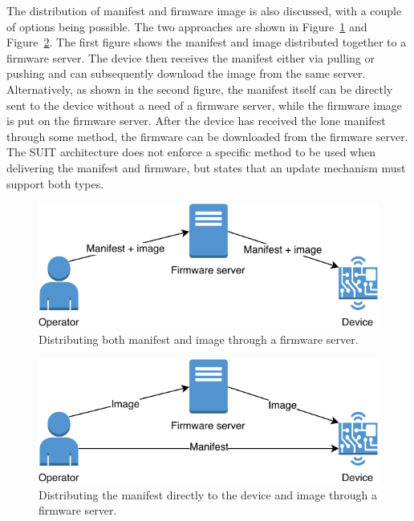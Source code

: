 \documentclass[0-thesis.tex]{subfiles}
\begin{document}
The distribution of manifest and firmware image is also discussed, with a couple of
options being possible. The two approaches are shown in
Figure~\ref{fig:manifest-image-combined-distribution} and
Figure~\ref{fig:manifest-image-separate-distribution}. The first figure shows the manifest
and image distributed together to a firmware server. The device then receives the manifest
either via pulling or pushing and can subsequently download the image from the same
server. Alternatively, as shown in the second figure, the manifest itself can be directly
sent to the device without a need of a firmware server, while the firmware image is put on
the firmware server. After the device has received the lone manifest through some method,
the firmware can be downloaded from the firmware server. The SUIT architecture does not
enforce a specific method to be used when delivering the manifest and firmware, but states
that an update mechanism must support both types.

\begin{figure}
    \caption{Distributing both manifest and image through a firmware server.}   
    \label{fig:manifest-image-combined-distribution}
    \includegraphics{images/together.pdf}
\end{figure}

\begin{figure}
    \caption{Distributing the manifest directly to the device and image through a firmware server.}
    \label{fig:manifest-image-separate-distribution}
    \includegraphics{images/separate.pdf}
\end{figure}
\end{document}
